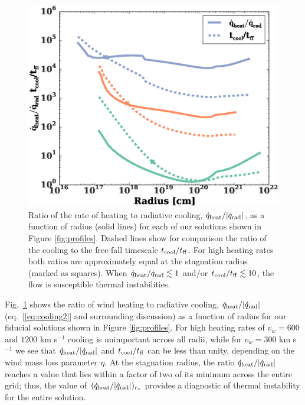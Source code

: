 \documentclass[usenatbib,fleqn]{mn2e}
\newcommand{\tcool}{t_{\rm cool}}
\newcommand{\tff}{t_{\rm ff}}
\begin{document}
\begin{figure}
  \includegraphics[width=\columnwidth]{cooling.eps}
  \caption{\label{fig:cooling} Ratio of the rate of heating to
radiative cooling, $\dot{q}_{\rm heat}/|\dot{q}_{\rm rad}|$, as a
function of radius (solid lines) for each of our solutions shown in
Figure \ref{fig:profiles}.  Dashed lines show for comparison the ratio
of the cooling to the free-fall timescale $t_{\rm cool}/t_{\rm ff}$.
For high heating rates both ratios are approximately equal at the
stagnation radius (marked as squares).  When $\dot{q}_{\rm
heat}/\dot{q}_{\rm rad} \lesssim 1$ and/or $t_{\rm cool}/t_{\rm ff}
\lesssim 10$, the flow is susceptible thermal instabilities.}
\end{figure}


Fig.~\ref{fig:cooling} shows the ratio of wind heating to radiative
cooling, $\dot{q}_{\rm heat}/|\dot{q}_{\rm rad}|$
(eq.~[\ref{eq:cooling2}] and surrounding discussion) as a function of
radius for our fiducial solutions shown in Figure \ref{fig:profiles}.
For high heating rates of $v_{w} = 600$ and $1200$ km s$^{-1}$ cooling
is unimportant across all radii, while for $v_{w} = 300$ km s$^{-1}$
we see that $\dot{q}_{\rm heat}/|\dot{q}_{\rm rad}|$ and $\tcool/\tff$
can be less than unity, depending on the wind mass loss parameter
$\eta$.  At the stagnation radius, the ratio $\dot{q}_{\rm
  heat}/|\dot{q}_{\rm rad}|$ reaches a value that lies within a factor
of two of its minimum across the entire grid; thus, the value of
$(\dot{q}_{\rm heat}/|\dot{q}_{\rm rad}|)_{r_{s}}$ provides a
diagnostic of thermal instability for the entire solution.
\end{document}
